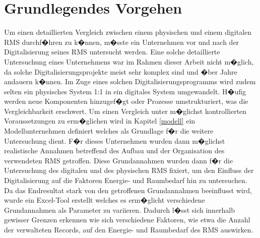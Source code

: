\documentclass[a4paper,twoside,10pt]{report}
\begin{document}
\section{Grundlegendes Vorgehen}
Um einen detaillierten Vergleich zwischen einem physischen und einem digitalen \ac{RMS} durchf�hren zu k�nnen, m�sste ein Unternehmen vor und nach der Digitalisierung seines \ac{RMS} untersucht werden. Eine solche detaillierte Untersuchung eines Unternehmens war im Rahmen dieser Arbeit nicht m�glich, da solche Digitalisierungsprojekte meist sehr komplex sind und �ber Jahre andauern k�nnen. Im Zuge eines solchen Digitalisierungsprogramms wird zudem selten ein physisches System 1:1 in ein digitales System umgewandelt. H�ufig werden neue Komponenten hinzugef�gt oder Prozesse umstrukturiert, was die Vergleichbarkeit erschwert. Um einen Vergleich unter m�glichst kontrollierten Voraussetzungen zu erm�glichen wird in Kapitel \ref{modell} ein Modellunternehmen definiert welches als Grundlage f�r die weitere Untersuchung dient. F�r dieses Unternehmen wurden dann m�glichst realistische Annahmen betreffend des Aufbau und der Organisation des verwendeten \ac{RMS} getroffen. Diese Grundannahmen wurden dann f�r die Untersuchung des digitalen und des physischen \ac{RMS} fixiert, um den Einfluss der Digitalisierung auf die Faktoren Energie- und Raumbedarf hin zu untersuchen. 
Da das Endresultat stark von den getroffenen Grundannahmen beeinflusst wird, wurde ein Excel-Tool erstellt welches es erm�glicht verschiedene Grundannahmen als Parameter zu variieren. Dadurch l�sst sich innerhalb gewisser Grenzen erkennen wie sich verschiedene Faktoren, wie etwa die Anzahl der verwalteten Records, auf den Energie- und Raumbedarf des \ac{RMS} auswirken.
\end{document}
